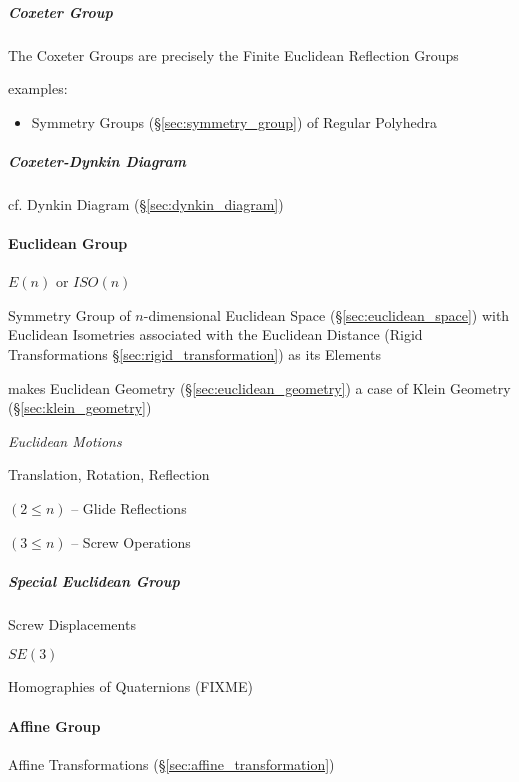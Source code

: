 \subparagraph{Coxeter Group}\label{sec:coxeter_group}\hfill

The Coxeter Groups are precisely the Finite Euclidean Reflection Groups

examples:
\begin{itemize}
  \item Symmetry Groups (\S\ref{sec:symmetry_group}) of Regular Polyhedra
\end{itemize}




\subparagraph{Coxeter-Dynkin Diagram}\label{sec:coxeter_dynkin_diagram}\hfill

cf. Dynkin Diagram (\S\ref{sec:dynkin_diagram})



\paragraph{Euclidean Group}\label{sec:euclidean_group}\hfill

$E(n)$ or $ISO(n)$

Symmetry Group of $n$-dimensional Euclidean Space (\S\ref{sec:euclidean_space})
with Euclidean Isometries associated with the Euclidean Distance (Rigid
Transformations \S\ref{sec:rigid_transformation}) as its Elements

makes Euclidean Geometry (\S\ref{sec:euclidean_geometry}) a case of
Klein Geometry (\S\ref{sec:klein_geometry})


\emph{Euclidean Motions}

Translation, Rotation, Reflection

$(2 \leq n)$ -- Glide Reflections

$(3 \leq n)$ -- Screw Operations



\subparagraph{Special Euclidean Group}\label{sec:special_euclidean}\hfill

Screw Displacements

$SE(3)$

Homographies of Quaternions (FIXME)



\paragraph{Affine Group}\label{sec:affine_group}\hfill

Affine Transformations (\S\ref{sec:affine_transformation})

